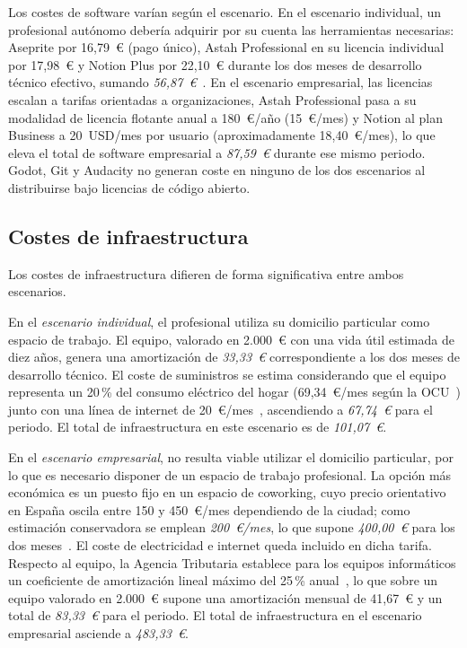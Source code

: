 Los costes de software varían según el escenario. En el escenario individual, un profesional autónomo debería adquirir por su cuenta las herramientas necesarias: Aseprite por 16,79~€ (pago único), Astah Professional en su licencia individual por 17,98~€ y Notion Plus por 22,10~€ durante los dos meses de desarrollo técnico efectivo, sumando \textit{56,87~€}~\cite{astah_pricing, astah_pricing_team, notion_pricing}. En el escenario empresarial, las licencias escalan a tarifas orientadas a organizaciones, Astah Professional pasa a su modalidad de licencia flotante anual a 180~€/año (15~€/mes) y Notion al plan Business a 20~USD/mes por usuario (aproximadamente 18,40~€/mes), lo que eleva el total de software empresarial a \textit{87,59~€} durante ese mismo periodo. Godot, Git y Audacity no generan coste en ninguno de los dos escenarios al distribuirse bajo licencias de código abierto.

\clearpage

\subsection{Costes de infraestructura}

Los costes de infraestructura difieren de forma significativa entre ambos escenarios.

En el \textit{escenario individual}, el profesional utiliza su domicilio particular como espacio de trabajo. El equipo, valorado en 2.000~€ con una vida útil estimada de diez años, genera una amortización de \textit{33,33~€} correspondiente a los dos meses de desarrollo técnico. El coste de suministros se estima considerando que el equipo representa un 20\,\% del consumo eléctrico del hogar (69,34~€/mes según la OCU~\cite{ocu_factura_luz}) junto con una línea de internet de 20~€/mes~\cite{digi_fibra}, ascendiendo a \textit{67,74~€} para el periodo. El total de infraestructura en este escenario es de \textit{101,07~€}.

En el \textit{escenario empresarial}, no resulta viable utilizar el domicilio particular, por lo que es necesario disponer de un espacio de trabajo profesional. La opción más económica es un puesto fijo en un espacio de coworking, cuyo precio orientativo en España oscila entre 150 y 450~€/mes dependiendo de la ciudad; como estimación conservadora se emplean \textit{200~€/mes}, lo que supone \textit{400,00~€} para los dos meses~\cite{inspira_coworking, skepp_oficinas}. El coste de electricidad e internet queda incluido en dicha tarifa. Respecto al equipo, la Agencia Tributaria establece para los equipos informáticos un coeficiente de amortización lineal máximo del 25\,\% anual~\cite{sage_amortizacion}, lo que sobre un equipo valorado en 2.000~€ supone una amortización mensual de 41,67~€ y un total de \textit{83,33~€} para el periodo. El total de infraestructura en el escenario empresarial asciende a \textit{483,33~€}.

